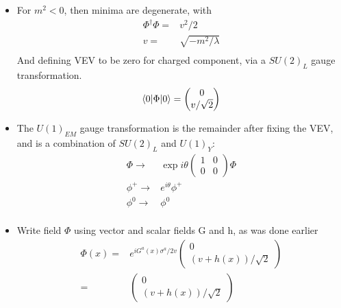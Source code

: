 \begin{itemize}
\begin{itemize}
        \item For $m^2<0$, then minima are degenerate, with \cite{wells}
        \begin{equation}\begin{split}
        \Phi^\dagger\Phi=&v^2/2 \\
        v=&\sqrt{-m^2/\lambda} \\
        \end{split}\end{equation}
        And defining VEV to be zero for charged component, via a $SU(2)_L$ gauge transformation.
        \begin{equation}\begin{split}
        \braket{0|\Phi|0}=\begin{pmatrix}0\\v/\sqrt{2}\end{pmatrix}
        \end{split}\end{equation}
        \item The $U(1)_{EM}$ gauge transformation is the remainder after fixing the VEV, and is a combination of $SU(2)_L$ and $U(1)_Y$: \cite{wells}
        \begin{equation}\begin{split}
        \Phi\to&\exp{i\theta \begin{pmatrix}1&0\\0&0\end{pmatrix}}\Phi \\
        \phi^+\to& e^{i\theta}\phi^+ \\
        \phi^0\to& \phi^0 \\
        \end{split}\end{equation}
        \item Write field $\Phi$ using vector and scalar fields G and h, as was done earlier \cite{wells}
        \begin{equation}\begin{split}
        \Phi(x)=&e^{iG^a(x)\sigma^a/2v} \begin{pmatrix}0\\(v+h(x))/\sqrt{2}\end{pmatrix} \\
        =&\begin{pmatrix}0\\(v+h(x))/\sqrt{2}\end{pmatrix} \\
        \end{split}\end{equation}

\end{itemize}
\end{itemize}
